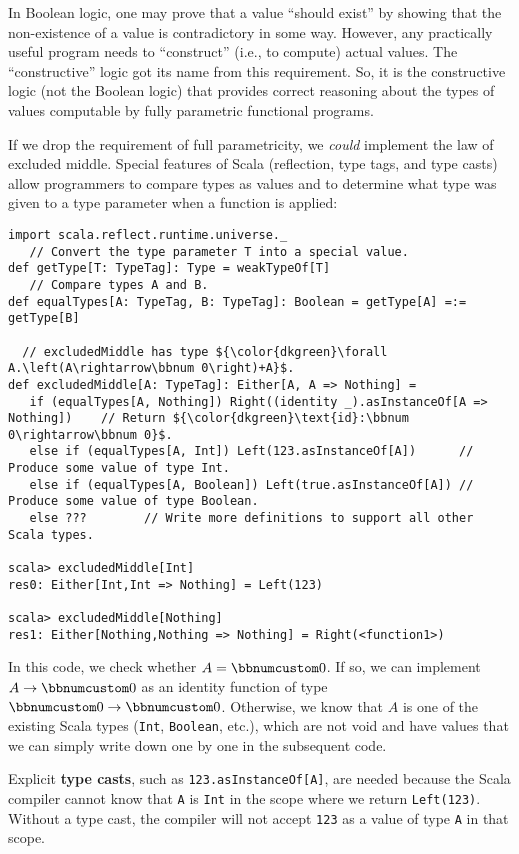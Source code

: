 In Boolean logic, one may prove that a value \textsf{``}should exist\textsf{''} by
showing that the non-existence of a value is contradictory in some
way. However, any practically useful program needs to \textsf{``}construct\textsf{''}
(i.e., to compute) actual values. The \textsf{``}constructive\textsf{''}
logic got its name from this requirement. So, it is the constructive
logic (not the Boolean logic) that provides correct reasoning about
the types of values computable by fully parametric functional programs.

If we drop the requirement of full parametricity, we \emph{could}
implement the law of excluded middle.
Special features of Scala (reflection, type tags, and type casts)
allow programmers to compare types as values and to determine what
type was given to a type parameter when a function is applied:
\begin{lstlisting}[mathescape=true]
import scala.reflect.runtime.universe._
   // Convert the type parameter T into a special value.
def getType[T: TypeTag]: Type = weakTypeOf[T]
   // Compare types A and B.
def equalTypes[A: TypeTag, B: TypeTag]: Boolean = getType[A] =:= getType[B]

  // excludedMiddle has type ${\color{dkgreen}\forall A.\left(A\rightarrow\bbnum 0\right)+A}$.
def excludedMiddle[A: TypeTag]: Either[A, A => Nothing] =
   if (equalTypes[A, Nothing]) Right((identity _).asInstanceOf[A => Nothing])    // Return ${\color{dkgreen}\text{id}:\bbnum 0\rightarrow\bbnum 0}$.
   else if (equalTypes[A, Int]) Left(123.asInstanceOf[A])      // Produce some value of type Int.
   else if (equalTypes[A, Boolean]) Left(true.asInstanceOf[A]) // Produce some value of type Boolean.
   else ???        // Write more definitions to support all other Scala types.

scala> excludedMiddle[Int]
res0: Either[Int,Int => Nothing] = Left(123)

scala> excludedMiddle[Nothing]
res1: Either[Nothing,Nothing => Nothing] = Right(<function1>) 
\end{lstlisting}
In this code, we check whether $A=\bbnum 0$. If so, we can implement
$A\rightarrow\bbnum 0$ as an identity function of type $\bbnum 0\rightarrow\bbnum 0$.
Otherwise, we know that $A$ is one of the existing Scala types (\lstinline!Int!,
\lstinline!Boolean!, etc.), which are not void and have values that
we can simply write down one by one in the subsequent code. 

Explicit \textbf{type casts}, such as \lstinline!123.asInstanceOf[A]!,
are needed because the Scala compiler cannot know that \lstinline!A!
is \lstinline!Int! in the scope where we return \lstinline!Left(123)!.
Without a type cast, the compiler will not accept \lstinline!123!
as a value of type \lstinline!A! in that scope.

